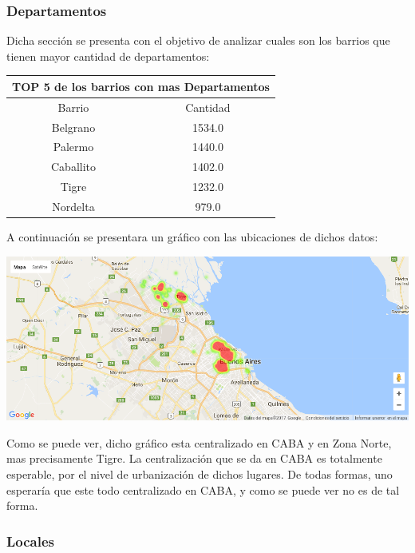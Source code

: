 \documentclass[a4paper, 10pt]{article}
\begin{document}
				\subsubsection{Departamentos}

				Dicha sección se presenta con el objetivo de analizar cuales son los barrios que tienen mayor cantidad de departamentos:

				\begin{center}
						\begin{tabular}{ |c|c| }
							\hline
							\multicolumn{2}{|c|}{TOP 5 de los barrios con mas Departamentos}\\
							\hline
							\hline
							Barrio & Cantidad\\
							\hline
							Belgrano & 1534.0 \\
							Palermo & 1440.0 \\
							Caballito &	1402.0 \\
							Tigre &	1232.0 \\
							Nordelta & 979.0 \\
							\hline
						\end{tabular}
					\end{center}

				A continuación se presentara un gráfico con las ubicaciones de dichos datos:

				\begin{center}
   		    				\includegraphics[width=\textwidth]{images/ubicMDeptos}
				\end{center}

				Como se puede ver, dicho gráfico esta centralizado en CABA y en Zona Norte, mas precisamente Tigre. La centralización que se da en CABA es totalmente esperable, por el nivel de urbanización de dichos lugares. De todas formas, uno esperaría que este todo centralizado en CABA, y como se puede ver no es de tal forma.

				\subsubsection{Locales}
\end{document}
